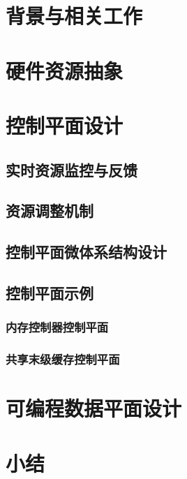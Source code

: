 \section{背景与相关工作}


\section{硬件资源抽象}


\section{控制平面设计}

\subsection{实时资源监控与反馈}

\subsection{资源调整机制}

\subsection{控制平面微体系结构设计}

\subsection{控制平面示例}

\subsubsection{内存控制器控制平面}

\subsubsection{共享末级缓存控制平面}


\section{可编程数据平面设计}


\section{小结}

